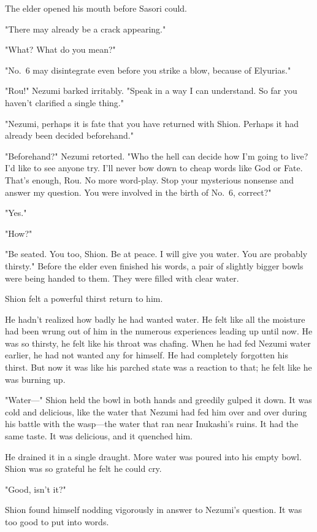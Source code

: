 The elder opened his mouth before Sasori could.

"There may already be a crack appearing."

"What? What do you mean?"

"No.~6 may disintegrate even before you strike a blow, because of
Elyurias."

"Rou!" Nezumi barked irritably. "Speak in a way I can understand. So far
you haven't clarified a single thing."

"Nezumi, perhaps it is fate that you have returned with Shion. Perhaps
it had already been decided beforehand."

"Beforehand?" Nezumi retorted. "Who the hell can decide how I'm going to
live? I'd like to see anyone try. I'll never bow down to cheap words
like God or Fate. That's enough, Rou. No more word-play. Stop your
mysterious nonsense and answer my question. You were involved in the
birth of No.~6, correct?"

"Yes."

"How?"

"Be seated. You too, Shion. Be at peace. I will give you water. You are
probably thirsty." Before the elder even finished his words, a pair of
slightly bigger bowls were being handed to them. They were filled with
clear water.

Shion felt a powerful thirst return to him.

He hadn't realized how badly he had wanted water. He felt like all the
moisture had been wrung out of him in the numerous experiences leading
up until now. He was so thirsty, he felt like his throat was chafing.
When he had fed Nezumi water earlier, he had not wanted any for himself.
He had completely forgotten his thirst. But now it was like his parched
state was a reaction to that; he felt like he was burning up.

"Water---" Shion held the bowl in both hands and greedily gulped it down.
It was cold and delicious, like the water that Nezumi had fed him over
and over during his battle with the wasp---the water that ran near
Inukashi's ruins. It had the same taste. It was delicious, and it
quenched him.

He drained it in a single draught. More water was poured into his empty
bowl. Shion was so grateful he felt he could cry.

"Good, isn't it?"

Shion found himself nodding vigorously in answer to Nezumi's question.
It was too good to put into words.

